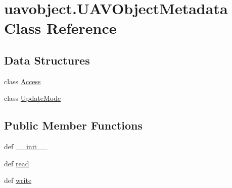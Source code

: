 \hypertarget{classuavobject_1_1_u_a_v_object_metadata}{\section{uavobject.\-U\-A\-V\-Object\-Metadata Class Reference}
\label{classuavobject_1_1_u_a_v_object_metadata}
}
\subsection*{Data Structures}
\begin{DoxyCompactItemize}
\item 
class \hyperlink{classuavobject_1_1_u_a_v_object_metadata_1_1_access}{Access}
\item 
class \hyperlink{classuavobject_1_1_u_a_v_object_metadata_1_1_update_mode}{Update\-Mode}
\end{DoxyCompactItemize}
\subsection*{Public Member Functions}
\begin{DoxyCompactItemize}
\item 
def \hyperlink{classuavobject_1_1_u_a_v_object_metadata_a624d80159a14066c74c6e3f42d53cea1}{\-\_\-\-\_\-init\-\_\-\-\_\-}
\item 
def \hyperlink{classuavobject_1_1_u_a_v_object_metadata_a2279efe9c99e6c87c29b3263397dcb78}{read}
\item 
def \hyperlink{classuavobject_1_1_u_a_v_object_metadata_ab27321a3eaf48b6877348877c6aeed96}{write}
\end{DoxyCompactItemize}
